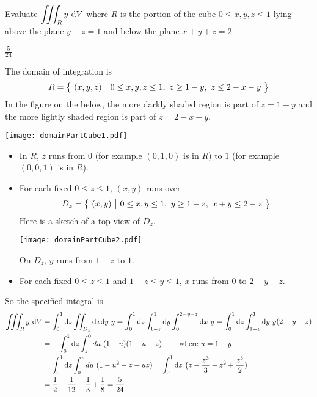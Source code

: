 \begin{question}
Evaluate $\displaystyle\iiint_R y\ \mathrm{d}V$ where $R$ is the portion
of the cube $0\le x,y,z\le 1$ lying above the plane $y+z=1$ and below the 
plane $x+y+z=2$.
\end{question}

%

\begin{answer}
$\frac{5}{24}$
\end{answer}

\begin{solution}
The domain of integration is 
\begin{equation*}
R = \big\{ \ (x,y,z)\ \big|\ 0\le x,y,z\le 1,\ z\ge 1-y,\ z\le2-x-y\ \big\}
\end{equation*}
In the figure on the  below, the more darkly shaded region 
is part of $z=1-y$ and the more lightly shaded region is part
of $z=2-x-y$. 
\begin{center}
     \texttt{[image: domainPartCube1.pdf]}
\end{center} 
\begin{itemize}
\item
In $R$, $z$ runs from $0$ (for example $(0,1,0)$ is in $R$)
to $1$ (for example $(0,0,1)$ is in $R$).
\item
For each fixed $0\le z\le 1$, $(x,y)$ runs over
\begin{equation*}
D_z = \Set{(x,y)}{0\le x,y\le 1,\ y\ge 1-z,\ x+y\le2-z}
\end{equation*}
Here is a sketch of a top view of $D_z$.
\begin{center}
     \texttt{[image: domainPartCube2.pdf]}
\end{center} 
On $D_z$, $y$ runs from $1-z$ to $1$.
\item
For each fixed $0\le z\le 1$ and $1-z\le y\le 1$, $x$ runs from $0$
to $2-y-z$. 
\end{itemize}
So the specified integral is
\begin{align*}
\iiint_R y\ \mathrm{d}V
&=\int_0^1\mathrm{d}z\iint_{D_z} \mathrm{d}x\mathrm{d}y\ y
=\int_0^1 \mathrm{d}z\int_{1-z}^1 \mathrm{d}y\int_0^{2-y-z} \mathrm{d}x\ y
=\int_0^1 \mathrm{d}z\int_{1-z}^1 \mathrm{d}y\ y(2-y-z)\cr
&=-\int_0^1 \mathrm{d}z\int_z^0 du\ (1-u)(1+u-z)\qquad\text{ where $u=1-y$}\\
&=\int_0^1 \mathrm{d}z\int_0^z du\ (1-u^2-z+uz)
=\int_0^1 \mathrm{d}z\ \big(z-\frac{z^3}{3}-z^2+\frac{z^3}{2})\\
&=\frac{1}{2}-\frac{1}{12}-\frac{1}{3}+\frac{1}{8}
=\frac{5}{24}
\end{align*}
\end{solution}

